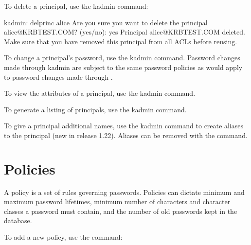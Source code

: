 \documentclass[letterpaper,10pt,english]{sphinxmanual}
\begin{document}
\sphinxAtStartPar
To delete a principal, use the kadmin  command:

\begin{sphinxVerbatim}[commandchars=\\\{\}]
kadmin: delprinc alice
Are you sure you want to delete the principal \PYGZdq{}alice@KRBTEST.COM\PYGZdq{}? (yes/no): yes
Principal \PYGZdq{}alice@KRBTEST.COM\PYGZdq{} deleted.
Make sure that you have removed this principal from all ACLs before reusing.
\end{sphinxVerbatim}

\sphinxAtStartPar
To change a principal’s password, use the kadmin 
command.  Password changes made through kadmin are subject to the same
password policies as would apply to password changes made through
.

\sphinxAtStartPar
To view the attributes of a principal, use the kadmin\textasciigrave{}
 command.

\sphinxAtStartPar
To generate a listing of principals, use the kadmin
 command.

\sphinxAtStartPar
To give a principal additional names, use the kadmin 
command to create aliases to the principal (new in release 1.22).
Aliases can be removed with the  command.


\section{Policies}
\label{\detokenize{admin/database:policies}}\label{\detokenize{admin/database:id2}}
\sphinxAtStartPar
A policy is a set of rules governing passwords.  Policies can dictate
minimum and maximum password lifetimes, minimum number of characters
and character classes a password must contain, and the number of old
passwords kept in the database.

\sphinxAtStartPar
To add a new policy, use the {\hyperref[\detokenize{admin/admin_commands/kadmin_local:kadmin-1}]{}}  command:

\begin{sphinxVerbatim}[commandchars=\\\{\}]
      
\end{sphinxVerbatim}
\end{document}
